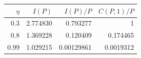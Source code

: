 \begin{ruledtabular}
\begin{tabular}{rrrr}
$\eta$ & $I(P)$ & $I(P)/P$ & $C(P,1)/P$ \\
\hline
0.3 & 2.774830 & 0.793277 & 1 \\
0.8 & 1.369228 & 0.120409 & 0.174465 \\
0.99 & 1.029215 & 0.00129861 & 0.0019312 \\
\end{tabular}
\end{ruledtabular}
